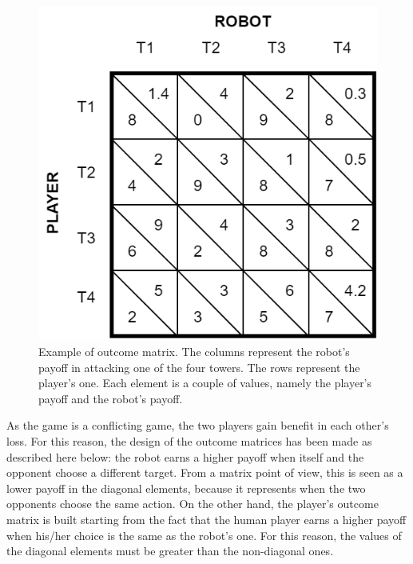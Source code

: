 \begin{figure}[htbp]
\centering
\includegraphics[scale=0.35]{images/06-deception/matrix}
\caption{Example of outcome matrix. The columns represent the  robot's payoff in attacking one of the four towers. The rows represent the player's one. Each element is a couple of values, namely the player's payoff and the robot's payoff.}
\label{fig::matrix}
\end{figure}

As the game is a conflicting game, the two players gain benefit in each other's loss. For this reason, the design of the outcome matrices has been made as described here below: the robot earns a higher payoff when itself and the opponent choose a different target. From a matrix point of view, this is seen as a lower payoff in the diagonal elements, because it represents when the two opponents choose the same action.
On the other hand, the player's outcome matrix is built starting from the fact that the human player earns a higher payoff when his/her choice is the same as the robot's one. For this reason, the values of the diagonal elements must be greater than the non-diagonal ones. 

